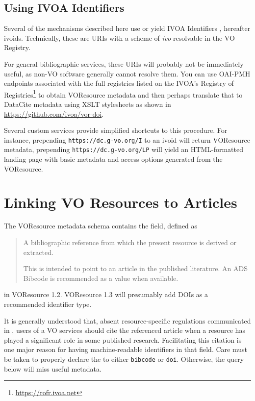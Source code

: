 \documentclass[11pt,a4paper]{ivoa}
\begin{document}
\subsection{Using IVOA Identifiers}
\label{sect:use-ivoid}

Several of the mechanisms described here use or yield IVOA Identifiers
\citep{2016ivoa.spec.0523D}, hereafter ivoids.  Technically, these are
URIs with a scheme of \textit{ivo} resolvable in the VO Registry.

For general bibliographic services, these URIs will probably not be
immediately useful, as non-VO software generally cannot resolve them.
You can use OAI-PMH endpoints associated with the full registries listed
on the IVOA's Registry of
Registries\footnote{\url{https://rofr.ivoa.net}} to obtain VOResource
metadata and then perhaps translate that to DataCite metadata using XSLT
stylesheets as shown in \url{https://github.com/ivoa/vor-doi}.

Several custom services provide simplified shortcuts to this procedure.
For instance, prepending \verb|https://dc.g-vo.org/I| to an ivoid will
return VOResource metadata, prepending \verb|https://dc.g-vo.org/LP|
will yield an HTML-formatted landing page with basic metadata and access
options generated from the VOResource.

\section{Linking VO Resources to Articles}

The VOResource metadata schema \citep{2018ivoa.spec.0625P} contains the
 field, defined as

\begin{quotation}
\noindent A bibliographic reference from which the present resource is
derived or extracted.

\noindent This is intended to point to an article in the published
literature. An ADS Bibcode is recommended as a value when available.
\end{quotation}

\noindent in VOResource 1.2.  VOResource 1.3 will presumably add DOIs as a
recommended identifier type.

It is generally understood that, absent resource-specific regulations
communicated in , users of a VO services should cite the
referenced article when a resource has played a significant role in some
published research.  Facilitating this citation is one major reason for
having machine-readable identifiers in that field.  Care must be taken
to properly declare the  to either \verb|bibcode|
or \verb|doi|. Otherwise, the query below will miss useful metadata.
\end{document}
